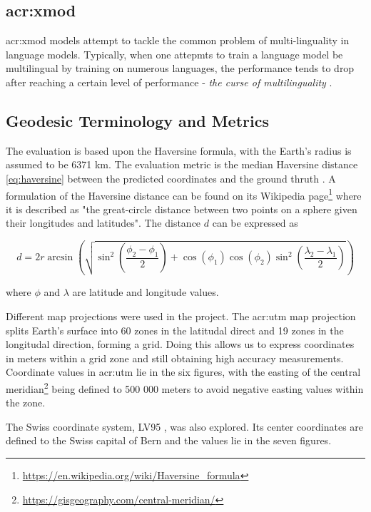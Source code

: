 
\subsection[X-Mod]{\acrshort{acr:xmod}}

\gls{acr:xmod} models \citep{pfeifferLiftingCurseMultilinguality2022} attempt to tackle the common problem of multi-linguality in language models. Typically, when one attepmts to train a  language model be multilingual by training on numerous languages, the performance tends to drop after reaching a certain level of performance - \textit{the curse of multilinguality} \citep[1]{pfeifferLiftingCurseMultilinguality2022}.

\subsection{Geodesic Terminology and Metrics}

The evaluation is based upon the Haversine formula, with the Earth's radius is assumed to be 6371 km. The evaluation metric is the median Haversine distance \eqref{eq:haversine} between the predicted coordinates and the ground thruth \citep[4]{scherrerHeLjuVarDial20202020}. A formulation of the Haversine distance can be found on its Wikipedia page\footnote{\url{https://en.wikipedia.org/wiki/Haversine_formula}} where it is described as "the great-circle distance between two points on a sphere given their longitudes and latitudes". The distance $d$ can be expressed as

\begin{equation}
    d = 2r \arcsin\left(\sqrt{\sin^2\left(\frac{\phi_2 - \phi_1}{2}\right) + \cos(\phi_1)\cos(\phi_2)\sin^2\left(\frac{\lambda_2 - \lambda_1}{2}\right)}\right)
    \label{eq:haversine}
\end{equation}

\noindent where $\phi$ and $\lambda$ are latitude and longitude values.

Different map projections were used in the project. The \gls{acr:utm} map projection splits Earth's surface into 60 zones in the latitudal direct and 19 zones in the longitudal direction, forming a grid. Doing this allows us to express coordinates in meters within a grid zone and still obtaining high accuracy measurements. Coordinate values in \acrshort{acr:utm} lie in the six figures, with the easting of the central meridian\footnote{\url{https://gisgeography.com/central-meridian/}} being defined to 500 000 meters to avoid negative easting values within the zone.

The Swiss coordinate system, LV95 \citep{federalofficeoftopographyswisstopoSwissCoordinatesSystem}, was also explored. Its center coordinates are defined to the Swiss capital of Bern and the values lie in the seven figures.
